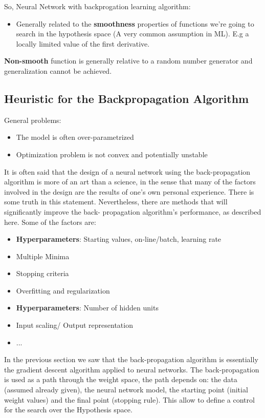 \documentclass[../main.tex]{subfiles}
\begin{document}
So, Neural Network with backprogation learning algorithm:
\begin{itemize}
    \item Generally related to the \textbf{smoothness} properties of functions we're going to search in the hypothesis space (A very common assumption in ML). E.g a locally limited value of the first derivative.
\end{itemize}
\textbf{Non-smooth} function is generally relative to a random number generator and generalization cannot be achieved.

\newpage
\subsection{Heuristic for the Backpropagation Algorithm}
General problems:
\begin{itemize}
    \item The model is often over-parametrized
    \item Optimization problem is not convex and potentially unstable
\end{itemize}
It is often said that the design of a neural network using the back-propagation algorithm is more of an art than a science, in the sense that many of the factors involved in the design are the results of one’s own personal experience. There is some truth in this statement. Nevertheless, there are methods that will significantly improve the back- propagation algorithm’s performance, as described here. Some of the factors are:
\begin{itemize}
    \item \textbf{Hyperparameters}: Starting values, on-line/batch, learning rate
    \item Multiple Minima
    \item Stopping criteria
    \item Overfitting and regularization
    \item \textbf{Hyperparameters}: Number of hidden units
    \item Input scaling/ Output representation
    \item ...
\end{itemize}

In the previous section we saw that the back-propagation algorithm is essentially the gradient descent algorithm applied to neural networks. The back-propagation is used as a path through the weight space, the path depends on: the data (assumed already given), the neural network model, the starting point (initial weight values) and the final point (stopping rule). This allow to define a control for the search over the Hypothesis space.
\end{document}
